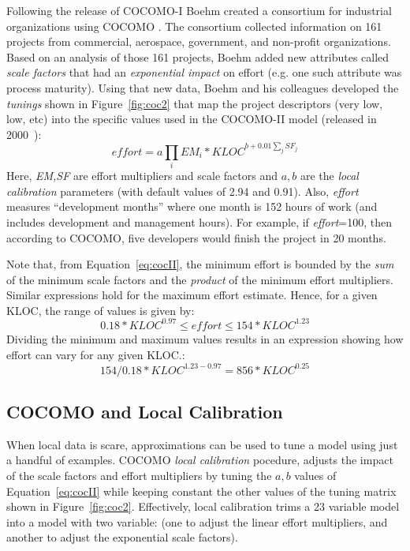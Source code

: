 \documentclass{sig-alternate}
\newcommand{\fig}[1]{Figure~\ref{fig:#1}}
\newcommand{\eq}[1]{Equation~\ref{eq:#1}}
\begin{document}
Following the release of COCOMO-I Boehm created a consortium for
industrial organizations using COCOMO .
The consortium
collected information on 161 projects from commercial,
aerospace, government, and non-profit organizations.
Based on an analysis of those 161 projects, Boehm
 added  new attributes called {\em scale factors}
that had an {\em exponential impact}
on effort (e.g. one such attribute was process maturity).
Using that new data, Boehm and his colleagues developed
the  {\em tunings} shown in \fig{coc2} that
map the project descriptors (very low, low, etc)
into the specific values used in the COCOMO-II model
(released in 2000~\cite{boehm00b}):
\begin{equation}\label{eq:cocII}
\mathit{effort}=a\prod_i EM_i *\mathit{KLOC}^{b+0.01\sum_j SF_j}
\end{equation}
Here, {\em EM,SF} are  effort multipliers and scale
factors and
 $a,b$ are the {\em local calibration} parameters (with default values of 2.94 and 0.91).
Also, {\em effort}
measures ``development months'' where one month
is 152 hours of work  (and includes development and management hours).
For example, if {\em effort}=100, then according to COCOMO,
five developers would finish
the project in 20 months.



Note that, from \eq{cocII},
the minimum  
effort  is bounded by the  {\em sum} of the minimum scale factors
and the {\em product} of the minimum effort multipliers.
Similar expressions hold for the  maximum effort estimate. Hence,
for a given KLOC, the range of values is given by:
\[
0.18*\mathit{KLOC}^{0.97}  \le \mathit{effort} \le 154*\mathit{KLOC}^{1.23}\]
Dividing the minimum and maximum values results in an  expression showing
how    effort can vary for any given KLOC.: 
\begin{equation}\label{eq:ration}
154/0.18 *\mathit{KLOC}^{1.23 - 0.97} = 856*\mathit{KLOC}^{0.25}
\end{equation}
 



 
\subsection{COCOMO and Local Calibration}\label{sect:coconut}
When local data is scare, approximations can be used to
tune a model using just a handful of examples.  
 COCOMO   {\em local calibration} pocedure, adjusts the impact of the scale factors and effort
multipliers by tuning the  $a,b$ values of Equation~\ref{eq:cocII}
while keeping constant the other values of the tuning matrix
shown in \fig{coc2}. Effectively, local calibration trims
a 23 variable model
into a model with two variable: (one  to adjust the linear effort
multipliers, and another to adjust the exponential scale factors).
\end{document}
